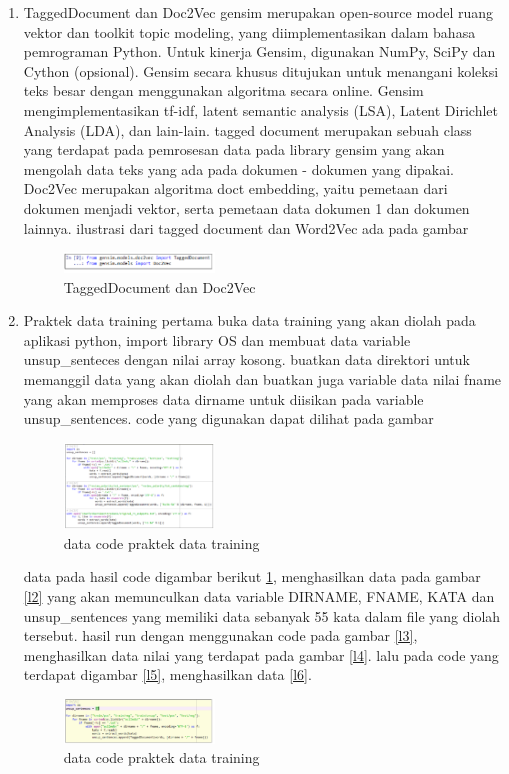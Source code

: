 \begin{enumerate}
\item TaggedDocument dan Doc2Vec
\subitem gensim merupakan open-source model ruang vektor dan toolkit topic modeling, yang diimplementasikan dalam bahasa pemrograman Python. Untuk kinerja Gensim, digunakan NumPy, SciPy dan Cython (opsional). Gensim secara khusus ditujukan untuk menangani koleksi teks besar dengan menggunakan algoritma secara online. Gensim mengimplementasikan tf-idf, latent semantic analysis (LSA), Latent Dirichlet Analysis (LDA), dan lain-lain. 
\subitem tagged document merupakan sebuah class yang terdapat pada pemrosesan data pada library gensim yang akan mengolah data teks yang ada pada dokumen - dokumen yang dipakai.
\subitem Doc2Vec merupakan algoritma doct embedding, yaitu pemetaan dari dokumen menjadi vektor, serta pemetaan data dokumen 1 dan dokumen lainnya.
ilustrasi dari tagged document dan Word2Vec ada pada gambar
\begin{figure}[H]
\includegraphics[width=4cm]{figures/1174002/chapter5/15.png}
\centering
\caption{TaggedDocument dan Doc2Vec}
\end{figure}

\item Praktek data training
\subitem pertama buka data training yang akan diolah pada aplikasi python, import library OS dan membuat data variable unsup\_senteces dengan nilai array kosong. buatkan data direktori untuk memanggil data yang akan diolah dan buatkan juga variable data nilai fname yang akan memproses data dirname untuk diisikan pada variable unsup\_sentences. code yang digunakan dapat dilihat pada gambar
\begin{figure}[H]
\includegraphics[width=4cm]{figures/1174002/chapter5/16.png}
\centering
\caption{data code praktek data training}
\end{figure}

data pada hasil code digambar berikut \ref{l1}, menghasilkan data pada gambar \ref{l2} yang akan memunculkan data variable DIRNAME, FNAME, KATA dan unsup\_sentences yang memiliki data sebanyak 55 kata dalam file yang diolah tersebut. hasil run dengan menggunakan code pada gambar \ref{l3}, menghasilkan data nilai yang terdapat pada gambar \ref{l4}. lalu pada code yang terdapat digambar \ref{l5}, menghasilkan data \ref{l6}.
\begin{figure}[H]
\includegraphics[width=4cm]{figures/1174002/chapter5/17.png}
\centering
\caption{data code praktek data training }
\label{l1}
\end{figure}


\end{enumerate}
